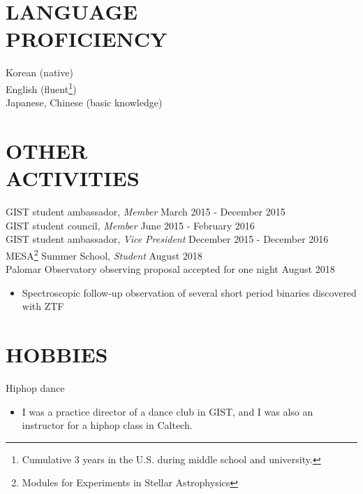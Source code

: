 \documentclass[margin, 10pt]{res} %
\begin{document}
\begin{resume}
\section{LANGUAGE \\ PROFICIENCY} 

Korean (native) \\
English (fluent\footnote{Cumulative 3 years in the U.S. during middle school and university.}) \\
Japanese, Chinese (basic knowledge) \\
 


\section{OTHER \\ ACTIVITIES} 

GIST student ambassador, {\sl Member} \hfill March 2015 - December 2015\\
GIST student council, {\sl Member} \hfill June 2015 - February 2016\\
GIST student ambassador, {\sl Vice President} \hfill December 2015 - December 2016 \\
MESA\footnote{Modules for Experiments in Stellar Astrophysics} Summer School, {\sl Student} \hfill August 2018 \\
Palomar Observatory observing proposal accepted for one night \hfill August 2018
\begin{itemize}
\item[] Spectroscopic follow-up observation of several short period binaries discovered with ZTF
\end{itemize}


\section{HOBBIES} 

Hiphop dance
\begin{itemize}
\item[] I was a practice director of a dance club in GIST, and I was also an instructor for a hiphop class in Caltech.
\end{itemize}



\end{resume}
\end{document}
